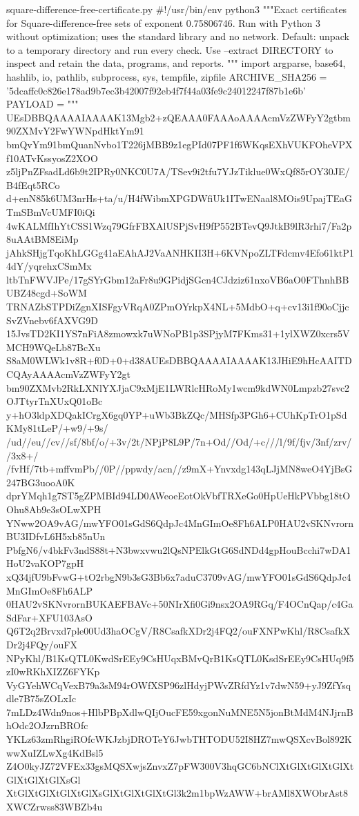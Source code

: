 \documentclass[11pt]{article}
\theoremstyle{definition}
\theoremstyle{remark}
\begin{document}
\begin{filecontents*}[overwrite]{square-difference-free-certificate.py}
#!/usr/bin/env python3
"""Exact certificates for Square-difference-free sets of exponent 0.75806746.
Run with Python 3 without optimization; uses the standard library and no network.
Default: unpack to a temporary directory and run every check.
Use --extract DIRECTORY to inspect and retain the data, programs, and reports.
"""
import argparse, base64, hashlib, io, pathlib, subprocess, sys, tempfile, zipfile
ARCHIVE_SHA256 = '5dcaffc0c826e178ad9b7ec3b42007f92eb4f7f44a03fe9c24012247f87b1e6b'
PAYLOAD = """
UEsDBBQAAAAIAAAAK13Mgb2+zQEAAA0FAAAoAAAAcmVzZWFyY2gtbm90ZXMvY2FwYWNpdHktYm91
bmQvYm91bmQuanNvbo1T226jMBB9z1egPId07PF1f6WKqsEXhVUKFOheVPXf10ATvKssyosZ2XOO
z5ljPnZFsadLd6b9t2IPRy0NKC0U7A/TSev9i2tfu7YJzTiklue0WxQf85rOY30JE/B4fEqt5RCo
d+enN85k6UM3nrHs+ta/u/H4fWibmXPGDWfiUk1ITwENaal8MOis9UpajTEaGTmSBmVcUMFI0iQi
4wKALMfIhYtCSS1Wzq79GfrFBXAlUSPjSvH9fP552BTevQ9JtkB9lR3rhi7/Fa2p8uAAtBM8EiMp
jAhkSHjgTqoKhLGGg41aEAhAJ2VaANHKII3H+6KVNpoZLTFdcmv4Efo61ktP14dY/yqrehxCSmMx
ltbTnFWVJPe/17gSYrGbm12aFr8u9GPidjSGcn4CJdziz61nxoVB6aO0FThnhBBUBZ48cgd+SoWM
TRNAZbSTPDiZgnXISFgyVRqA0ZPmOYrkpX4NL+5MdbO+q+cv13i1f90oCjjcSvZVnebv6fAXVG9D
15JvsTD2KI1YS7nFiA8zmowxk7uWNoPB1p3SPjyM7FKms31+1ylXWZ0xcrs5VMCH9WQeLb87BcXu
S8aM0WLWk1v8R+f0D+0+d38AUEsDBBQAAAAIAAAAK13JHiE9hHcAAITDCQAyAAAAcmVzZWFyY2gt
bm90ZXMvb2RkLXNlYXJjaC9xMjE1LWRlcHRoMy1wcm9kdWN0Lmpzb27svc2OJTtyrTnXUxQ01oBc
y+hO3ldpXDQakICrgX6gq0YP+uWb3BkZQc/MHSfp3PGh6+CUhKpTrO1pSdKMy81tLeP/+w9/+9s/
/ud//eu//cv//sf/8bf/o/+3v/2t/NPjP8L9P/7n+Od//Od/+c///l/9f/fjv/3nf/zrv//3x8+/
/fvHf/7tb+mffvmPb//0P//ppwdy/acn//z9mX+Ynvxdg143qLJjMN8weO4YjBsG247BG3uooA0K
dprYMqh1g7ST5gZPMBId94LD0AWeoeEotOkVbfTRXeGo0HpUeHkPVbbg18tOOhu8Ab9e3sOLwXPH
YNww2OA9vAG/mwYFO01sGdS6QdpJc4MnGImOe8Fh6ALP0HAU2vSKNvrornBU3IDfvL6H5xb85nUn
PbfgN6/v4bkFv3ndS88t+N3bwxvwu2lQsNPElkGtG6SdNDd4gpHouBcchi7wDA1HoU2vaKOP7gpH
xQ34jfU9bFvwG+tO2rbgN9b3sG3Bb6x7aduC3709vAG/mwYFO01sGdS6QdpJc4MnGImOe8Fh6ALP
0HAU2vSKNvrornBUKAEFBAVc+50NIrXfi0Gi9nsx2OA9RGq/F4OCnQap/c4GaSdFar+XFU103AsO
Q6T2q2Brvxd7ple00Ud3haOCgV/R8CsafkXDr2j4FQ2/ouFXNPwKhl/R8CsafkXDr2j4FQy/ouFX
NPyKhl/B1KsQTL0KwdSrEEy9CsHUqxBMvQrB1KsQTL0KsdSrEEy9CsHUq9f5zI0wRKhXIZZ6FYKp
VyGYehWCqVexB79a3sM94rOWfXSP96zlHdyjPWvZRfdYz1v7dwN59+yJ9ZfYsqdle7B75sZOLxIc
7mLDz4Wdn9nos+HlbPBpXdlwQIjOucFE59xgonNuMNE5N5jonBtMdM4NJjrnBhOdc2OJzrnBROfc
YKLz63zmRhgiROfcWKJzbjDROTeY6JwbTHTODU52I8HZ7mwQSXcvBol892KwwXuIZLwXg4KdBsl5
Z4O0kyJZ72VFEx33gsMQSXwjsZnvxZ7pFW300V3hqGC6bNClXtGlXtGlXtGlXtGlXtGlXtGlXsGl
XtGlXtGlXtGlXtGlXsGlXtGlXtGlXtGl3k2m1bpWzAWW+brAMl8XWObrAst8XWCZrwss83WBZb4u

\end{filecontents*}
\end{document}
